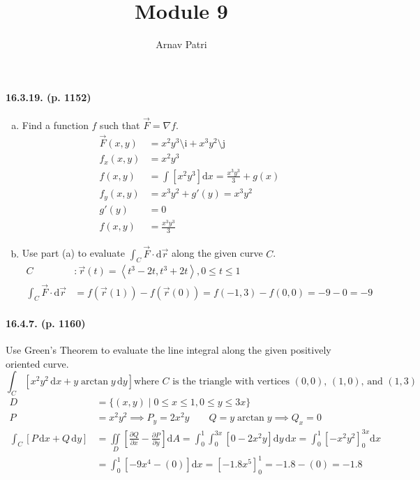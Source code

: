 \documentclass[A4, 12pt]{article}
\title{Module 9}
\author{Arnav Patri}
\renewcommand{\d}{\mathrm{d}}
\newcommand{\pder}[2]{\frac{\partial #1}{\partial #2}}
\newcommand{\vi}{\text{\^\i}}
\newcommand{\vj}{\text{\^\j}}
\begin{document}
	\maketitle
	\thispagestyle{empty}
	\paragraph{16.3.19. (p. 1152)}
		\begin{enumerate}[(a)]
			\item 
				Find a function $f$ such that $\vec{F} = \nabla f$.
				\begin{align*}
					\vec{F}(x, y) &= x^2y^3\vi + x^3y^2\vj \\
					f_x(x, y) &= x^2y^3 \\
					f(x, y) &= \int\left[x^2y^3\right]\d x
							= \frac{x^3y^3}{3} + g(x) \\
					f_y(x, y) &= x^3y^2 + g'(y) = x^3y^2 \\
					g'(y) &= 0 \\
					f(x, y) &= \frac{x^3y^3}{3}
				\end{align*}
			\item 
				Use part (a) to evaluate $\int_C \vec{F} \cdot \d\vec{r}$ along the given curve $C$.
				\begin{align*}
					C &: \vec{r}(t) = \left\langle t^3 - 2t, t^3 + 2t \right\rangle, 0 \le t \le 1 \\
					\int_C \vec{F} \cdot \d\vec{r} &= f(\vec{r}(1)) - f(\vec{r}(0))
							= f(-1, 3) - f(0, 0) 
							= -9 - 0
							= -9
				\end{align*}
		\end{enumerate}
	\paragraph{16.4.7. (p. 1160)}
		Use Green's Theorem to evaluate the line integral along the given positively oriented curve.
			\[\int_C\left[x^2y^2\,\d x + y\arctan y\,\d y\right] \text{where $C$ is the triangle with vertices $(0, 0)$, $(1, 0)$, and $(1, 3)$}\]
			\begin{align*}
				D &= \{(x, y) \mid 0 \le x \le 1, 0 \le y \le 3x\} \\
				P &=x^2y^2 \implies P_y = 2x^2y \qquad Q = y\arctan{y} \implies Q_x = 0 \\
				\int_C[P\,\d x + Q\,\d y] &= \iint\limits_D\left[\pder{Q}{x} - \pder{P}{y}\right]\d A
						= \int_0^1\int_0^{3x}\left[0 - 2x^2y\right]\d y\,\d x 
						= \int_0^1\left[-x^2y^2\right]_0^{3x}\d x \\
					&= \int_0^1\left[-9x^4 - (0)\right]\d x 
						= \left[-1.8x^5\right]_0^1
						= -1.8 - (0)
						= -1.8
			\end{align*}
\end{document}
